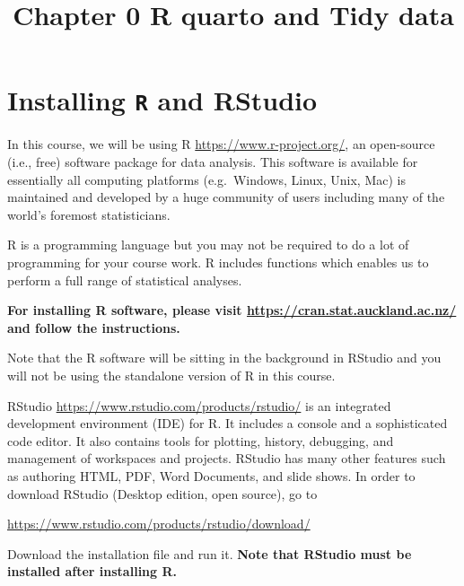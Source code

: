 \documentclass[
  letterpaper,
  DIV=11,
  numbers=noendperiod]{scrreprt}
\title{Chapter 0 R quarto and Tidy data}
\author{}
\date{}
\renewcommand*\contentsname{Table of contents}
\newcommand\contentsname{Table of contents}
\begin{document}
\maketitle
\ifdefined\Shaded\renewenvironment{Shaded}{\begin{tcolorbox}[frame hidden, breakable, interior hidden, sharp corners, borderline west={3pt}{0pt}{shadecolor}, boxrule=0pt, enhanced]}{\end{tcolorbox}}\fi

\renewcommand*\contentsname{Table of contents}
{
\hypersetup{linkcolor=}
\setcounter{tocdepth}{2}
\tableofcontents
}
\hypertarget{installing-r-and-rstudio}{%
\chapter{\texorpdfstring{Installing \texttt{R} and
RStudio}{Installing R and RStudio}}\label{installing-r-and-rstudio}}

In this course, we will be using R \url{https://www.r-project.org/}, an
open-source (i.e., free) software package for data analysis. This
software is available for essentially all computing platforms
(e.g.~Windows, Linux, Unix, Mac) is maintained and developed by a huge
community of users including many of the world's foremost statisticians.

R is a programming language but you may not be required to do a lot of
programming for your course work. R includes functions which enables us
to perform a full range of statistical analyses.

\textbf{For installing R software, please visit
\url{https://cran.stat.auckland.ac.nz/} and follow the instructions.}

Note that the R software will be sitting in the background in RStudio
and you will not be using the standalone version of R in this course.

RStudio \url{https://www.rstudio.com/products/rstudio/} is an integrated
development environment (IDE) for R. It includes a console and a
sophisticated code editor. It also contains tools for plotting, history,
debugging, and management of workspaces and projects. RStudio has many
other features such as authoring HTML, PDF, Word Documents, and slide
shows. In order to download RStudio (Desktop edition, open source), go
to

\url{https://www.rstudio.com/products/rstudio/download/}

Download the installation file and run it. \textbf{Note that RStudio
must be installed after installing R.}
\end{document}
